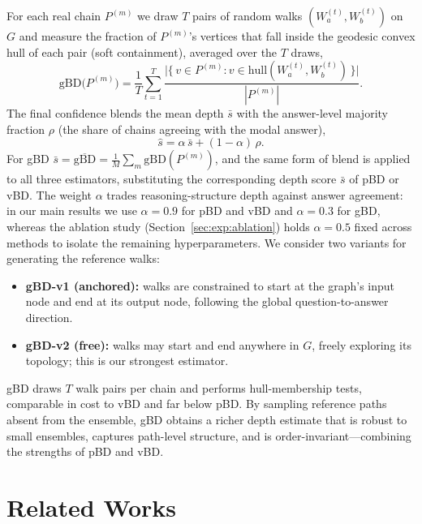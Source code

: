\documentclass[11pt]{article}
\begin{document}
For each real chain $P^{(m)}$ we draw $T$ pairs of random walks
$(W_a^{(t)}, W_b^{(t)})$ on $G$ and measure the fraction of $P^{(m)}$'s vertices
that fall inside the geodesic convex hull of each pair (soft containment),
averaged over the $T$ draws,
\begin{equation}
  \text{gBD}\big(P^{(m)}\big) = \frac{1}{T} \sum_{t=1}^{T}
  \frac{\big|\{\, v \in P^{(m)} : v \in \text{hull}(W_a^{(t)}, W_b^{(t)}) \,\}\big|}{|P^{(m)}|}.
\end{equation}
The final confidence blends the mean depth $\bar{s}$ with the answer-level
majority fraction $\rho$ (the share of chains agreeing with the modal answer),
\begin{equation}
\label{eq:blend}
  \hat{s} = \alpha \, \bar{s} + (1 - \alpha)\, \rho.
\end{equation}
For gBD $\bar{s} = \overline{\text{gBD}} = \frac{1}{M}\sum_m \text{gBD}(P^{(m)})$,
and the same form of blend is applied to all three estimators, substituting the
corresponding depth score $\bar{s}$ of pBD or vBD. The weight $\alpha$ trades
reasoning-structure depth against answer agreement: in our main results we use
$\alpha = 0.9$ for pBD and vBD and $\alpha = 0.3$ for gBD, whereas the ablation
study (Section~\ref{sec:exp:ablation}) holds $\alpha = 0.5$ fixed across methods
to isolate the remaining hyperparameters. We consider two variants for generating
the reference walks:
\begin{itemize}
  \item \textbf{gBD-v1 (anchored):} walks are constrained to start at the graph's
        input node and end at its output node, following the global
        question-to-answer direction.
  \item \textbf{gBD-v2 (free):} walks may start and end anywhere in $G$, freely
        exploring its topology; this is our strongest estimator.
\end{itemize}

gBD draws $T$ walk pairs per chain and performs hull-membership tests, comparable
in cost to vBD and far below pBD. By sampling reference paths absent from the
ensemble, gBD obtains a richer depth estimate that is robust to small ensembles,
captures path-level structure, and is order-invariant---combining the strengths
of pBD and vBD.

\section{Related Works}
\label{sec:related}
\end{document}
